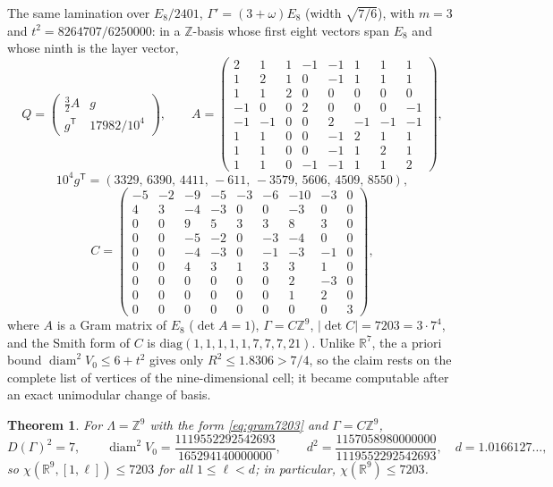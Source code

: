 \documentclass[10pt]{article}
\theoremstyle{plain}
\newtheorem{theorem}{Theorem}[section]
\theoremstyle{remark}
\newcommand{\R}{\mathbb{R}}
\newcommand{\Z}{\mathbb{Z}}
\newcommand{\diam}{\operatorname{diam}}
\begin{document}
The same lamination over $E_8/2401$, $\Gamma'=(3+\omega)E_8$ (width
$\sqrt{7/6}$), with $m=3$ and $t^2=8264707/6250000$: in a $\Z$-basis whose
first eight vectors span $E_8$ and whose ninth is the layer vector,
\begin{equation}\label{eq:gram7203}
Q=\begin{pmatrix}\tfrac32A&g\\ g^{\mathsf T}&17982/10^4\end{pmatrix},\qquad
A=\begin{pmatrix}
2&1&1&-1&-1&1&1&1\\ 1&2&1&0&-1&1&1&1\\ 1&1&2&0&0&0&0&0\\ -1&0&0&2&0&0&0&-1\\
-1&-1&0&0&2&-1&-1&-1\\ 1&1&0&0&-1&2&1&1\\ 1&1&0&0&-1&1&2&1\\ 1&1&0&-1&-1&1&1&2
\end{pmatrix},
\end{equation}
\[
10^4g^{\mathsf T}=(3329,\,6390,\,4411,\,-611,\,-3579,\,5606,\,4509,\,8550),
\]
\[
C=\begin{pmatrix}
-5&-2&-9&-5&-3&-6&-10&-3&0\\ 4&3&-4&-3&0&0&-3&0&0\\ 0&0&9&5&3&3&8&3&0\\
0&0&-5&-2&0&-3&-4&0&0\\ 0&0&-4&-3&0&-1&-3&-1&0\\ 0&0&4&3&1&3&3&1&0\\
0&0&0&0&0&0&2&-3&0\\ 0&0&0&0&0&0&1&2&0\\ 0&0&0&0&0&0&0&0&3
\end{pmatrix},
\]
where $A$ is a Gram matrix of $E_8$ ($\det A=1$), $\Gamma=C\Z^9$,
$|\det C|=7203=3\cdot7^4$, and the Smith form of $C$ is
$\mathrm{diag}(1,1,1,1,1,7,7,7,21)$. Unlike $\R^7$, the a priori bound
$\diam^2V_0\le6+t^2$ gives only $R^2\le1.8306>7/4$, so the claim rests on the
complete list of vertices of the nine-dimensional cell; it became computable
after an exact unimodular change of basis.

\begin{theorem}\label{thm:7203}
For $\Lambda=\Z^9$ with the form \eqref{eq:gram7203} and $\Gamma=C\Z^9$,
\[
D(\Gamma)^2=7,\qquad
\diam^2V_0=\frac{1119552292542693}{165294140000000},\qquad
d^2=\frac{1157058980000000}{1119552292542693},\quad d=1.0166127\ldots,
\]
so $\chi(\R^9,[1,\ell])\le7203$ for all $1\le\ell<d$; in particular,
$\chi(\R^9)\le7203$.
\end{theorem}
\end{document}
